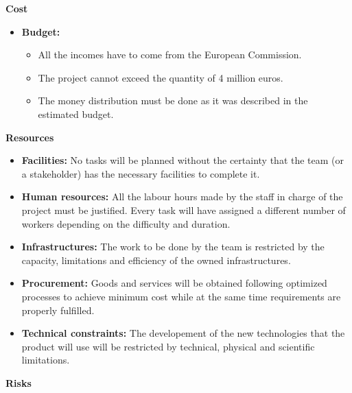 \textbf{Cost}

\begin{itemize}
	
	\item \textbf{Budget:}
	
	\begin{itemize}
		
		\item All the incomes have to come from the European Commission.
		
		\item The project cannot exceed the quantity of 4 million euros.
		
		\item The money distribution must be done as it was described in the estimated budget.
		
	\end{itemize}

\end{itemize}

\textbf{Resources}

\begin{itemize}
	
	\item \textbf{Facilities:} No tasks will be planned without the certainty that the team (or a stakeholder) has the necessary facilities to complete it.
	
	\item \textbf{Human resources:} All the labour hours made by the staff in charge of the project must be justified. Every task will have assigned a different number of workers depending on the difficulty and duration.
	
	\item \textbf{Infrastructures:} The work to be done by the team is restricted by the capacity, limitations and efficiency of the owned infrastructures.
	
	\item \textbf{Procurement:} Goods and services will be obtained following optimized processes to achieve minimum cost while at the same time requirements are properly fulfilled.
	
	\item \textbf{Technical constraints:} The developement of the new technologies that the product will use will be restricted by technical, physical and scientific limitations.
	
	
\end{itemize}

\textbf{Risks}

